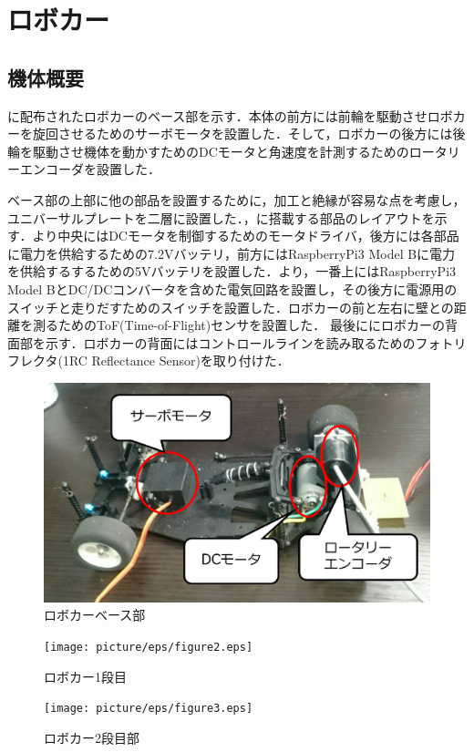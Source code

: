 \section{ロボカー}
\subsection{機体概要}
に配布されたロボカーのベース部を示す．本体の前方には前輪を駆動させロボカーを旋回させるためのサーボモータを設置した．そして，ロボカーの後方には後輪を駆動させ機体を動かすためのDCモータと角速度を計測するためのロータリーエンコーダを設置した．

ベース部の上部に他の部品を設置するために，加工と絶縁が容易な点を考慮し，ユニバーサルプレートを二層に設置した．，に搭載する部品のレイアウトを示す．より中央にはDCモータを制御するためのモータドライバ，後方には各部品に電力を供給するための7.2Vバッテリ，前方にはRaspberryPi3 Model Bに電力を供給するするための5Vバッテリを設置した．より，一番上にはRaspberryPi3 Model BとDC/DCコンバータを含めた電気回路を設置し，その後方に電源用のスイッチと走りだすためのスイッチを設置した．ロボカーの前と左右に壁との距離を測るためのToF(Time-of-Flight)センサを設置した．
最後ににロボカーの背面部を示す．ロボカーの背面にはコントロールラインを読み取るためのフォトリフレクタ(1RC Reflectance Sensor)を取り付けた．

\begin{figure}[htb]
 \centering
  \includegraphics[width=0.5\hsize]{picture/eps/figure1.eps}
  \caption{ロボカーベース部}
  \label{fig::figure1}
\end{figure}

\begin{figure}[htb]
 \centering
  \texttt{[image: picture/eps/figure2.eps]}
  \caption{ロボカー1段目}
  \label{fig::figure2}
\end{figure}

\begin{figure}[htb]
 \centering
  \texttt{[image: picture/eps/figure3.eps]}
  \caption{ロボカー2段目部}
  \label{fig::figure3}
\end{figure}

